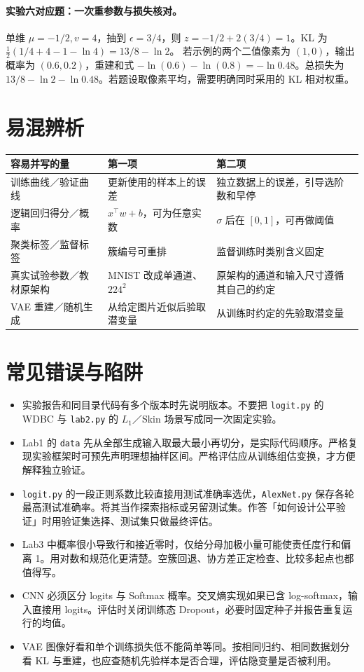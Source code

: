 \documentclass[UTF8,a4paper,zihao=-4,fontset=fandol]{ctexrep}
\begin{document}
\paragraph{实验六对应题：一次重参数与损失核对。}
单维 $\mu=-1/2,v=4$，抽到 $\epsilon=3/4$，则 $z=-1/2+2(3/4)=1$。KL 为 $\frac12(1/4+4-1-\ln4)=13/8-\ln2$。
若示例的两个二值像素为 $(1,0)$，输出概率为 $(0.6,0.2)$，重建和式 $-\ln(0.6)-\ln(0.8)=-\ln0.48$。总损失为 $13/8-\ln2-\ln0.48$。若题设取像素平均，需要明确同时采用的 KL 相对权重。

\section{易混辨析}
\begin{tabularx}{\linewidth}{@{}p{.24\linewidth}XX@{}}
\toprule
容易并写的量 & 第一项 & 第二项\\
\midrule
训练曲线／验证曲线 & 更新使用的样本上的误差 & 独立数据上的误差，引导选阶数和早停\\
逻辑回归得分／概率 & $x^\top w+b$，可为任意实数 & $\sigma$ 后在 $[0,1]$，可再做阈值\\
聚类标签／监督标签 & 簇编号可重排 & 监督训练时类别含义固定\\
真实试验参数／教材原架构 & MNIST 改成单通道、$224^2$ & 原架构的通道和输入尺寸遵循其自己的约定\\
VAE 重建／随机生成 & 从给定图片近似后验取潜变量 & 从训练时约定的先验取潜变量\\
\bottomrule
\end{tabularx}

\section{常见错误与陷阱}
\begin{itemize}
\item 实验报告和同目录代码有多个版本时先说明版本。不要把 \texttt{logit.py} 的 WDBC 与 \texttt{lab2.py} 的 $L_1$／Skin 场景写成同一次固定实验。
\item Lab1 的 \texttt{data} 先从全部生成输入取最大最小再切分，是实际代码顺序。严格复现实验框架时可预先声明理想抽样区间。严格评估应从训练组估变换，才方便解释独立验证。
\item \texttt{logit.py} 的一段正则系数比较直接用测试准确率选优，\texttt{AlexNet.py} 保存各轮最高测试准确率。将其当作探索指标或另留测试集。作答「如何设计公平验证」时用验证集选择、测试集只做最终评估。
\item Lab3 中概率很小导致行和接近零时，仅给分母加极小量可能使责任度行和偏离 1。用对数和规范化更清楚。空簇回退、协方差正定检查、比较多起点也都值得写。
\item CNN 必须区分 logits 与 Softmax 概率。交叉熵实现如果已含 log-softmax，输入直接用 logits。评估时关闭训练态 Dropout，必要时固定种子并报告重复运行的均值。
\item VAE 图像好看和单个训练损失低不能简单等同。按相同归约、相同数据划分看 KL 与重建，也应查随机先验样本是否合理，评估隐变量是否被利用。
\end{itemize}
\end{document}
